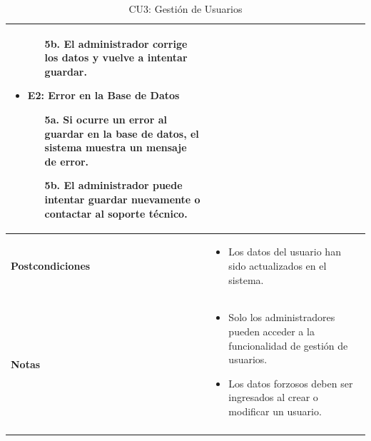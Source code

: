 \documentclass{article}
\begin{document}
\begin{longtable}{|l|p{10cm}|}
\begin{itemize}
\begin{enumerate}
        \item[5b.] El administrador corrige los datos y vuelve a intentar guardar.
    \end{enumerate}
    \item \textbf{E2: Error en la Base de Datos}
    \begin{enumerate}
        \item[5a.] Si ocurre un error al guardar en la base de datos, el sistema muestra un mensaje de error.
        \item[5b.] El administrador puede intentar guardar nuevamente o contactar al soporte técnico.
    \end{enumerate}
\end{itemize} \\ \hline
\textbf{Postcondiciones} & 
\begin{itemize}
    \item Los datos del usuario han sido actualizados en el sistema.
\end{itemize} \\ \hline
\textbf{Notas} & 
\begin{itemize}
    \item Solo los administradores pueden acceder a la funcionalidad de gestión de usuarios.
    \item Los datos forzosos deben ser ingresados al crear o modificar un usuario.
\end{itemize} \\ \hline
\caption{CU3: Gestión de Usuarios}
\end{longtable}

\newpage
\end{document}
